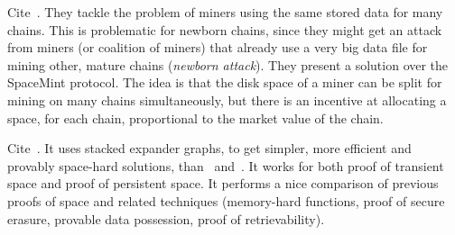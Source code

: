 

Cite~\cite{TangZDWLG0L19}. They tackle the problem of miners using the same stored data
for many chains. This is problematic for newborn chains, since they might get an attack
from miners (or coalition of miners) that already use a very big data file for mining other,
mature chains (\emph{newborn attack}). They present a solution over the SpaceMint protocol.
The idea is that the disk space of a miner can be split for mining on many chains
simultaneously, but there is an incentive at allocating a space, for each chain, proportional
to the market value of the chain.

Cite~\cite{RenD16}. It uses stacked expander graphs, to get simpler, more efficient and
provably space-hard solutions, than~\cite{AtenieseBFG14} and~\cite{DziembowskiFKP15}.
It works for both proof of transient space and proof of persistent space.
It performs a nice comparison of previous proofs of space
and related techniques (memory-hard functions, proof of secure erasure, provable data possession,
proof of retrievability).

